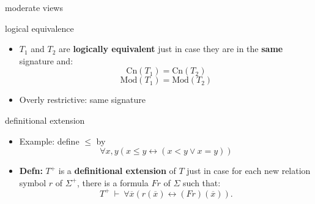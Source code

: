 \documentclass[17pt]{beamer}
\begin{document}
\begin{frame}{moderate views}



\begin{center}
\end{center}



\end{frame}




\begin{frame}{logical equivalence}

\begin{itemize}
\item $T_1$ and $T_2$ are \textbf{logically equivalent} just in case
they are in the \textbf{same} signature and:
\[ \mathrm{Cn}(T_1)=\mathrm{Cn}(T_2) \]
\[ \mathrm{Mod}(T_1)=\mathrm{Mod}(T_2) \]
\item Overly restrictive: same signature
\end{itemize}


\end{frame}



\begin{frame}{definitional extension}

\begin{itemize}
\item Example: define $\leq$ by 
\[ \forall x,y(x\leq y\leftrightarrow (x<y\vee x=y)) \]
\item \textbf{Defn:} $T^+$ is a \textbf{definitional extension} of $T$
  just in case for each new relation symbol $r$ of $\Sigma ^+$, there
  is a formula $Fr$ of $\Sigma$ such that:
\[ T^+ \: \vdash \: \forall \overline{x}(r(\overline{x})\leftrightarrow (Fr)(\overline{x})) .\]
\end{itemize}


\end{frame}
\end{document}
